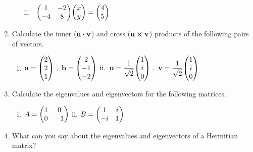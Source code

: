\documentclass{article}
\begin{document}
\begin{enumerate}
\begin{enumerate}[label=i.]
          ii.
          \ \( \displaystyle \mqty(1 & -2 \\ -4 & 8)\mqty(x \\ y)=\mqty(4 \\ 5) \)
      \end{enumerate}
  \vspace{3.5cm}
  \item Calculate the inner ($\vb{u}\vdot\vb{v}$) and cross ($\vb{u}\cross\vb{v}$) products of the following pairs of vectors.
  \begin{enumerate}[label=i.]
    \item \( \displaystyle \vb{a}=\mqty(2\\2\\1)\ ,\ \vb{b}=\mqty(2\\-1\\-2) \)\hspace{3cm} ii.\ \( \displaystyle \vb{u}=\frac{1}{\sqrt{2}}\mqty(1\\i\\0)\ ,\ \vb{v}=\frac{1}{\sqrt{2}}\mqty(1\\i\\0) \)
  \end{enumerate}
  \vspace{6cm}
  \item Calculate the eigenvalues and eigenvectors for the following matrices.
  \begin{enumerate}[label=i.]
    \item $A = \mqty(1&0\\0&-1)$
    \hspace{5cm}
    ii. $B = \mqty(1&i\\-i&1)$
  \end{enumerate}
  \vspace{6cm}
  \item What can you say about the eigenvalues and eigenvectors of a Hermitian matrix?

\end{enumerate}
\end{document}
